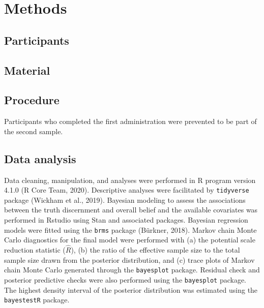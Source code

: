 \documentclass[
  man,floatsintext]{apa6}
\begin{document}
\hypertarget{methods}{%
\section{Methods}\label{methods}}

\hypertarget{participants}{%
\subsection{Participants}\label{participants}}

\hypertarget{material}{%
\subsection{Material}\label{material}}

\hypertarget{procedure}{%
\subsection{Procedure}\label{procedure}}

Participants who completed the first administration were prevented to be part of the second sample.

\hypertarget{data-analysis}{%
\subsection{Data analysis}\label{data-analysis}}

Data cleaning, manipulation, and analyses were performed in R program version 4.1.0 (R Core Team, 2020). Descriptive analyses were facilitated by \texttt{tidyverse} package (Wickham et al., 2019). Bayesian modeling to assess the associations between the truth discernment and overall belief and the available covariates was performed in Rstudio using Stan and associated packages. Bayesian regression models were fitted using the \texttt{brms} package (Bürkner, 2018). Markov chain Monte Carlo diagnostics for the final model were performed with (a) the potential scale reduction statistic (\(\hat{R}\)), (b) the ratio of the effective sample size to the total sample size drawn from the posterior distribution, and (c) trace plots of Markov chain Monte Carlo generated through the \texttt{bayesplot} package. Residual check and posterior predictive checks were also performed using the \texttt{bayesplot} package. The highest density interval of the posterior distribution was estimated using the \texttt{bayestestR} package.
\end{document}
